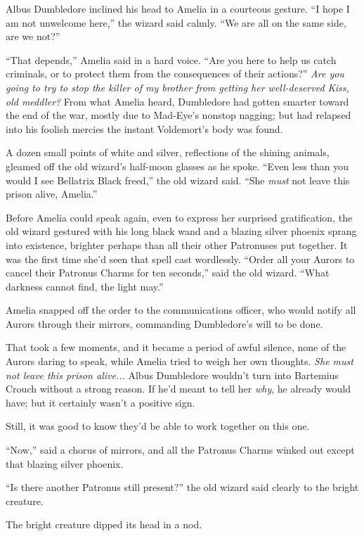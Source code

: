 Albus Dumbledore inclined his head to Amelia in a courteous gesture. ``I hope I am not unwelcome here,'' the wizard said calmly. ``We are all on the same side, are we not?''

``That depends,'' Amelia said in a hard voice. ``Are you here to help us catch criminals, or to protect them from the consequences of their actions?'' \emph{Are you going to try to stop the killer of my brother from getting her well-deserved Kiss, old meddler?} From what Amelia heard, Dumbledore had gotten smarter toward the end of the war, mostly due to Mad-Eye's nonstop nagging; but had relapsed into his foolish mercies the instant Voldemort's body was found.

A dozen small points of white and silver, reflections of the shining animals, gleamed off the old wizard's half-moon glasses as he spoke. ``Even less than you would I see Bellatrix Black freed,'' the old wizard said. ``She \emph{must} not leave this prison alive, Amelia.''

Before Amelia could speak again, even to express her surprised gratification, the old wizard gestured with his long black wand and a blazing silver phoenix sprang into existence, brighter perhaps than all their other Patronuses put together. It was the first time she'd seen that spell cast wordlessly. ``Order all your Aurors to cancel their Patronus Charms for ten seconds,'' said the old wizard. ``What darkness cannot find, the light may.''

Amelia snapped off the order to the communications officer, who would notify all Aurors through their mirrors, commanding Dumbledore's will to be done.

That took a few moments, and it became a period of awful silence, none of the Aurors daring to speak, while Amelia tried to weigh her own thoughts. \emph{She must not leave this prison alive...} Albus Dumbledore wouldn't turn into Bartemius Crouch without a strong reason. If he'd meant to tell her \emph{why}, he already would have; but it certainly wasn't a positive sign.

Still, it was good to know they'd be able to work together on this one.

``Now,'' said a chorus of mirrors, and all the Patronus Charms winked out except that blazing silver phoenix.

``Is there another Patronus still present?'' the old wizard said clearly to the bright creature.

The bright creature dipped its head in a nod.

